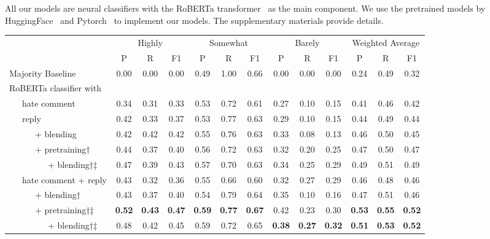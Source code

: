 \documentclass[11pt]{article}
\begin{document}
	
	All our models are neural classifiers with the RoBERTa transformer~\cite{DBLP:journals/corr/abs-1907-11692} as the main component.
	We use the pretrained models by HuggingFace~\cite{wolf-etal-2020-transformers}
	and Pytorch~\cite{NEURIPS2019_9015} to implement our models.
	The supplementary materials provide details.
	
	\begin{table*}[ht!]
		\setlength{\tabcolsep}{.0775in}
		\small
		\centering	
		\begin{tabular}{l ccc ccc ccc ccc}
			\toprule
			\multicolumn{1}{c}{} & \multicolumn{3}{c}{Highly} & \multicolumn{3}{c}{Somewhat} & \multicolumn{3}{c}{Barely} & \multicolumn{3}{c}{Weighted Average} \\
			\cmidrule(lr){2-4} \cmidrule(lr){5-7} \cmidrule(lr){8-10} \cmidrule(lr){11-13} 
			& P & R & F1 & P & R & F1 & P & R & F1 & P & R & F1 \\
			\hline
			\addlinespace[1pt]
			Majority Baseline & 0.00 & 0.00 & 0.00 & 0.49 & 1.00 & 0.66 & 0.00 & 0.00 & 0.00 &  0.24 & 0.49 & 0.32 \\ \addlinespace
			
			RoBERTa classifier with \\ 
			~~~hate comment & 0.34 & 0.31 & 0.33 & 0.53 & 0.72 & 0.61 & 0.27 & 0.10 & 0.15 & 0.41 & 0.46 & 0.42 \\ \addlinespace
			
			~~~reply & 0.42 & 0.33 & 0.37 & 0.53 & 0.77 & 0.63 & 0.29 & 0.10 & 0.15 & 0.44 & 0.49 & 0.44\\		
			~~~~~~+ blending & 0.42 & 0.42 & 0.42 & 0.55 & 0.76 & 0.63 & 0.33 & 0.08 & 0.13 & 0.46 & 0.50 & 0.45\\
			~~~~~~+ pretraining† & 0.44 & 0.37 & 0.40 & 0.56 & 0.72 & 0.63 & 0.32 & 0.20 & 0.25 & 0.47 & 0.50 & 0.47\\ 
			~~~~~~~~~+ blending†‡ & 0.47 & 0.39 & 0.43 & 0.57 & 0.70 & 0.63 & 0.34 & 0.25 & 0.29 & 0.49 & 0.51 & 0.49\\ 
			\addlinespace
			
			~~~hate comment + reply & 0.43 & 0.32 & 0.36 & 0.55 & 0.66 & 0.60 & 0.32 & 0.27 & 0.29 & 0.46 & 0.48 & 0.46\\
			~~~~~~+ blending† & 0.43 & 0.37 & 0.40 & 0.54 & 0.79 & 0.64 & 0.35 & 0.10 & 0.16 & 0.47 & 0.51 & 0.46\\
			~~~~~~+ pretraining†‡ & \textbf{0.52} & \textbf{0.43} & \textbf{0.47} & \textbf{0.59} & \textbf{0.77}& \textbf{0.67} & 0.42 & 0.23 & 0.30 & \textbf{0.53 }& \textbf{0.55} & \textbf{0.52}\\
			~~~~~~~~~+ blending†‡ & 0.48 & 0.42 & 0.45 & 0.59 & 0.72 & 0.65 & \textbf{0.38} & \textbf{0.27} & \textbf{0.32} & \textbf{0.51} & \textbf{0.53} & \textbf{0.52}\\
			\bottomrule
			

\end{tabular}
\end{table*}
\end{document}
